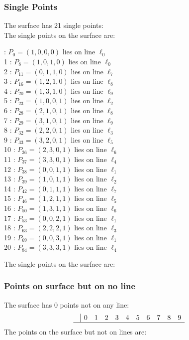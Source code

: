 \documentclass{article}
\begin{document}
{\subsubsection*{Single Points}
The surface has 21 single points:\\
The single points on the surface are:\\
\begin{multicols}{2}
 : $P_{0}=( 1, 0, 0, 0 )$ lies on line $\ell_{0}$\\
1 : $P_{8}=( 1, 0, 1, 0 )$ lies on line $\ell_{0}$\\
2 : $P_{11}=( 0, 1, 1, 0 )$ lies on line $\ell_{7}$\\
3 : $P_{16}=( 1, 2, 1, 0 )$ lies on line $\ell_{8}$\\
4 : $P_{20}=( 1, 3, 1, 0 )$ lies on line $\ell_{9}$\\
5 : $P_{23}=( 1, 0, 0, 1 )$ lies on line $\ell_{2}$\\
6 : $P_{28}=( 2, 1, 0, 1 )$ lies on line $\ell_{8}$\\
7 : $P_{29}=( 3, 1, 0, 1 )$ lies on line $\ell_{9}$\\
8 : $P_{32}=( 2, 2, 0, 1 )$ lies on line $\ell_{3}$\\
9 : $P_{33}=( 3, 2, 0, 1 )$ lies on line $\ell_{5}$\\
10 : $P_{36}=( 2, 3, 0, 1 )$ lies on line $\ell_{6}$\\
11 : $P_{37}=( 3, 3, 0, 1 )$ lies on line $\ell_{4}$\\
12 : $P_{38}=( 0, 0, 1, 1 )$ lies on line $\ell_{1}$\\
13 : $P_{39}=( 1, 0, 1, 1 )$ lies on line $\ell_{2}$\\
14 : $P_{42}=( 0, 1, 1, 1 )$ lies on line $\ell_{7}$\\
15 : $P_{46}=( 1, 2, 1, 1 )$ lies on line $\ell_{5}$\\
16 : $P_{50}=( 1, 3, 1, 1 )$ lies on line $\ell_{6}$\\
17 : $P_{53}=( 0, 0, 2, 1 )$ lies on line $\ell_{1}$\\
18 : $P_{63}=( 2, 2, 2, 1 )$ lies on line $\ell_{3}$\\
19 : $P_{69}=( 0, 0, 3, 1 )$ lies on line $\ell_{1}$\\
20 : $P_{84}=( 3, 3, 3, 1 )$ lies on line $\ell_{4}$\\
\end{multicols}
The single points on the surface are:\\
\subsubsection*{Points on surface but on no line}
The surface has 0 points not on any line:\\
$$
\begin{array}{r|*{10}{r}}
 & 0 & 1 & 2 & 3 & 4 & 5 & 6 & 7 & 8 & 9\\
\hline
\end{array}
$$
The points on the surface but not on lines are:\\
\begin{multicols}{2}
\noindent
\end{multicols}
}
\end{document}
